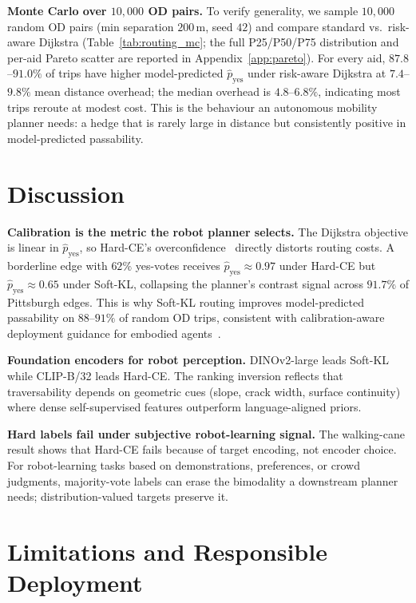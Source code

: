 \documentclass{article}
\begin{document}
\textbf{Monte Carlo over $10{,}000$ OD pairs.} To verify generality, we sample $10{,}000$ random OD pairs (min separation $200$\,m, seed $42$) and compare standard vs.\ risk-aware Dijkstra (Table~\ref{tab:routing_mc}; the full P25/P50/P75 distribution and per-aid Pareto scatter are reported in Appendix~\ref{app:pareto}). For every aid, $87.8$--$91.0\%$ of trips have higher model-predicted $\hat{p}_\mathrm{yes}$ under risk-aware Dijkstra at $7.4$--$9.8\%$ mean distance overhead; the median overhead is $4.8$--$6.8\%$, indicating most trips reroute at modest cost. This is the behaviour an autonomous mobility planner needs: a hedge that is rarely large in distance but consistently positive in model-predicted passability.


\FloatBarrier
\section{Discussion}
\label{sec:discussion}

\textbf{Calibration is the metric the robot planner selects.} The Dijkstra objective is linear in $\hat{p}_\mathrm{yes}$, so Hard-CE's overconfidence~\citep{guo2017calibration,minderer2021revisiting} directly distorts routing costs. A borderline edge with $62\%$ yes-votes receives $\hat{p}_\mathrm{yes}\approx0.97$ under Hard-CE but $\hat{p}_\mathrm{yes}\approx0.65$ under Soft-KL, collapsing the planner's contrast signal across $91.7\%$ of Pittsburgh edges. This is why Soft-KL routing improves model-predicted passability on $88$--$91\%$ of random OD trips, consistent with calibration-aware deployment guidance for embodied agents~\citep{zollo2025calibration}.

\textbf{Foundation encoders for robot perception.} DINOv2-large leads Soft-KL while CLIP-B/32 leads Hard-CE. The ranking inversion reflects that traversability depends on geometric cues (slope, crack width, surface continuity) where dense self-supervised features outperform language-aligned priors.

\textbf{Hard labels fail under subjective robot-learning signal.} The walking-cane result shows that Hard-CE fails because of target encoding, not encoder choice. For robot-learning tasks based on demonstrations, preferences, or crowd judgments, majority-vote labels can erase the bimodality a downstream planner needs; distribution-valued targets preserve it.

\section{Limitations and Responsible Deployment}
\label{sec:limitations}
\end{document}
